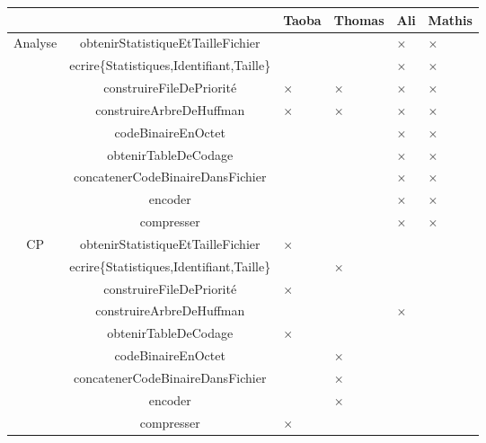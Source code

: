 
 \begin{table}[ht]
    \centering
    \begin{tabular}{|c|c|>{\centering\arraybackslash}p{1.5cm}|>{\centering\arraybackslash}p{1.5cm}|>{\centering\arraybackslash}p{1.5cm}|>{\centering\arraybackslash}p{1.5cm}|}
        \cline{3-6}
        \multicolumn{2}{c|}{} & Taoba & Thomas & Ali & Mathis \\
        \hline
        \multirow{8}{*}{Analyse}
        & obtenirStatistiqueEtTailleFichier & & & $\times$ & $\times$ \\
        \cline{2-6}
        & ecrire\{Statistiques,Identifiant,Taille\} &  & & $\times$ & $\times$ \\ 
        \cline{2-6}
        & construireFileDePriorité & $\times$ & $\times$ & $\times$ & $\times$ \\
        \cline{2-6}
        & construireArbreDeHuffman & $\times$ & $\times$ & $\times$ & $\times$ \\
        \cline{2-6}
        & codeBinaireEnOctet & & & $\times$ & $\times$ \\
        \cline{2-6}
        & obtenirTableDeCodage & & & $\times$ & $\times$ \\
        \cline{2-6}
        & concatenerCodeBinaireDansFichier & & & $\times$ & $\times$ \\
        \cline{2-6}
        & encoder & & & $\times$ & $\times$ \\
        \cline{2-6}
        & compresser & & & $\times$ & $\times$ \\
        \hline
        \multirow{8}{*}{CP}
        & obtenirStatistiqueEtTailleFichier & $\times$ & & &  \\
        \cline{2-6}
        & ecrire\{Statistiques,Identifiant,Taille\} & & $\times$ & & \\ 
        \cline{2-6}
        & construireFileDePriorité & $\times$ & & &  \\
        \cline{2-6}
        & construireArbreDeHuffman & & & $\times$ & \\
        \cline{2-6}
        & obtenirTableDeCodage & $\times$ & & &  \\
        \cline{2-6}
        & codeBinaireEnOctet & & $\times$& & \\
        \cline{2-6}
        & concatenerCodeBinaireDansFichier & & $\times$ & & \\
        \cline{2-6}
        & encoder & & $\times$ & & \\
        \cline{2-6}
        & compresser & $\times$ & & & \\

\end{tabular}
\end{table}
